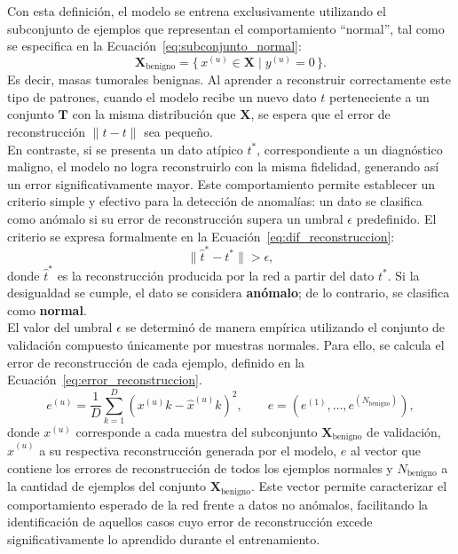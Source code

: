 \documentclass[a4paper,10pt]{book}
\begin{document}
Con esta definición, el modelo se entrena exclusivamente utilizando el subconjunto de ejemplos que representan el comportamiento ``normal'', tal como se especifica en la Ecuación~\ref{eq:subconjunto_normal}:
\begin{equation}
	\mathbf{X}_{\text{benigno}}
	= \bigl\{\, x^{(u)} \in \mathbf{X} \;\big|\; y^{(u)} = 0 \,\bigr\}.
	\label{eq:subconjunto_normal}
\end{equation}
Es decir, masas tumorales benignas. Al aprender a reconstruir correctamente este tipo de patrones, cuando el modelo recibe un nuevo dato $t$ perteneciente a un conjunto $\mathbf{T}$ con la misma distribución que $\mathbf{X}$, se espera que el error de reconstrucción $\lVert \hat{t} - t \rVert$ sea pequeño.\\

En contraste, si se presenta un dato atípico $t^{*}$, correspondiente a un diagnóstico maligno, el modelo no logra reconstruirlo con la misma fidelidad, generando así un error significativamente mayor. Este comportamiento permite establecer un criterio simple y efectivo para la detección de anomalías: un dato se clasifica como anómalo si su error de reconstrucción supera un umbral $\epsilon$ predefinido. El criterio se expresa formalmente en la Ecuación~\ref{eq:dif_reconstruccion}:
\begin{equation}
	\lVert \hat{t}^{*} - t^{*}  \rVert > \epsilon,
	\label{eq:dif_reconstruccion}
\end{equation}
donde $\hat{t}^{*}$ es la reconstrucción producida por la red a partir del dato $t^{*}$. Si la desigualdad se cumple, el dato se considera \textbf{anómalo}; de lo contrario, se clasifica como \textbf{normal}.\\

El valor del umbral $\epsilon$ se determinó de manera empírica utilizando el conjunto de validación compuesto únicamente por muestras normales. Para ello, se calcula el error de reconstrucción de cada ejemplo, definido en la Ecuación~\ref{eq:error_reconstruccion}.
\begin{equation}
	e^{(u)} =
	\frac{1}{D}
	\sum_{k=1}^{D}
	\left( x^{(u)}{k} - \hat{x}^{(u)}{k} \right)^{2},
	\qquad
	e = \left( e^{(1)}, \dots, e^{(N_{\text{benigno}})} \right),
	\label{eq:error_reconstruccion}
\end{equation}
donde $x^{(u)}$ corresponde a cada muestra del subconjunto $\mathbf{X}_{\text{benigno}}$ de validación, $\hat{x}^{(u)}$ a su respectiva reconstrucción generada por el modelo, $e$ al vector que contiene los errores de reconstrucción de todos los ejemplos normales y $N_{\text{benigno}}$ a la cantidad de ejemplos del conjunto $\mathbf{X}_{\text{benigno}}$. Este vector permite caracterizar el comportamiento esperado de la red frente a datos no anómalos, facilitando la identificación de aquellos casos cuyo error de reconstrucción excede significativamente lo aprendido durante el entrenamiento.\\
\end{document}
